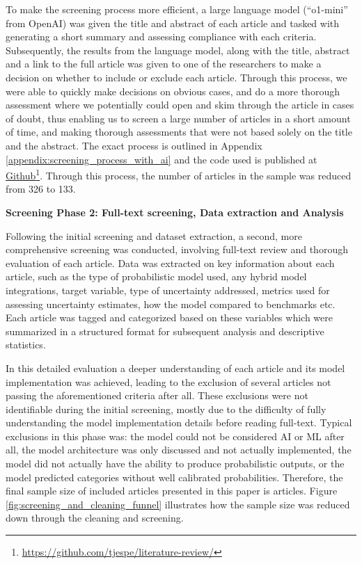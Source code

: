 To make the screening process more efficient, a large language model (``o1-mini'' from OpenAI) was given the title and abstract of each article and tasked with generating a short summary and assessing compliance with each criteria. Subsequently, the results from the language model, along with the title, abstract and a link to the full article was given to one of the researchers to make a decision on whether to include or exclude each article. Through this process, we were able to quickly make decisions on obvious cases, and do a more thorough assessment where we potentially could open and skim through the article in cases of doubt, thus enabling us to screen a large number of articles in a short amount of time, and making thorough assessments that were not based solely on the title and the abstract. The exact process is outlined in Appendix \ref{appendix:screening_process_with_ai} and the code used is published at \href{https://github.com/tjespe/literature-review/}{Github}\footnote{\label{footnote:github_link}\href{https://github.com/tjespe/literature-review/}{https://github.com/tjespe/literature-review/}}. Through this process, the number of articles in the sample was reduced from 326 to 133.




\textbf{Screening Phase 2: Full-text screening, Data extraction and Analysis}\nopagebreak

Following the initial screening and dataset extraction, a second, more comprehensive screening was conducted, involving full-text review and thorough evaluation of each article. Data was extracted on key information about each article, such as the type of probabilistic model used, any hybrid model integrations, target variable, type of uncertainty addressed, metrics used for assessing uncertainty estimates, how the model compared to benchmarks etc. Each article was tagged and categorized based on these variables which were summarized in a structured format for subsequent analysis and descriptive statistics. 

In this detailed evaluation a deeper understanding of each article and its model implementation was achieved, leading to the exclusion of several articles not passing the aforementioned criteria after all. These exclusions were not identifiable during the initial screening, mostly due to the difficulty of fully understanding the model implementation details before reading full-text. Typical exclusions in this phase was: the model could not be considered AI or ML after all, the model architecture was only discussed and not actually implemented, the model did not actually have the ability to produce probabilistic outputs, or the model predicted categories without well calibrated probabilities. Therefore, the final sample size of included articles presented in this paper is \samplesize articles. Figure \ref{fig:screening_and_cleaning_funnel} illustrates how the sample size was reduced down through the cleaning and screening. 

